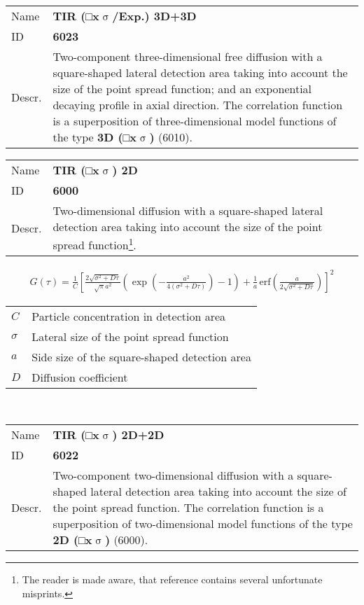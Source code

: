 \noindent \begin{tabular}{lp{}}
Name & \textbf{TIR (□x$\upsigma$/Exp.) 3D+3D} \\ 
ID & \textbf{6023} \\ 
Descr. &  Two-component three-dimensional free diffusion with a square-shaped lateral detection area taking into account the size of the point spread function; and an exponential decaying profile in axial direction. \newline
The correlation function is a superposition of three-dimensional model functions of the type \textbf{3D (□x$\upsigma$)} (6010)\cite{Ries2008390, Yordanov2011}. \\
\end{tabular}
\vspace{2em}


\noindent \begin{tabular}{lp{}}
Name & \textbf{TIR (□x$\upsigma$) 2D} \\ 
ID & \textbf{6000} \\ 
Descr. &  Two-dimensional diffusion with a square-shaped lateral detection area taking into account the size of the point spread function\cite{Ries2008390, Yordanov2011}\footnote{The reader is made aware, that reference \cite{Ries2008390} contains several unfortunate misprints.}. \\ 
\end{tabular}
\begin{align}
G(\tau) = \frac{1}{C} \left[
\frac{2 \sqrt{\sigma^2+D \tau}}{\sqrt{\pi} a^2}
\left( \exp\left(-\frac{a^2}{4(\sigma^2+D \tau)}\right) - 1 \right) +
\frac{1}{a} \, \mathrm{erf}\left(\frac{a}{2 \sqrt{\sigma^2+D \tau}}\right)
\right]^2
\end{align} 
\begin{center}
\begin{tabular}{ll}
$C$ & Particle concentration in detection area \\ 
$\sigma$ & Lateral size of the point spread function \\ 
$a$ & Side size of the square-shaped detection area \\
$D$ & Diffusion coefficient \\
\end{tabular} \\
\end{center}
\vspace{2em}


\noindent \begin{tabular}{lp{}}
Name & \textbf{TIR (□x$\upsigma$) 2D+2D} \\ 
ID & \textbf{6022} \\ 
Descr. &  Two-component two-dimensional diffusion with a square-shaped lateral detection area taking into account the size of the point spread function. \newline
The correlation function is a superposition of two-dimensional model functions of the type \textbf{2D (□x$\upsigma$)} (6000)\cite{Ries2008390, Yordanov2011}. \\
\end{tabular}
\vspace{2em}


